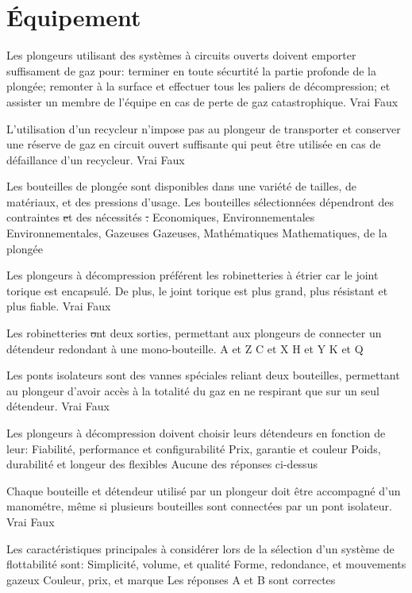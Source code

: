 \documentclass[english,10pt,a4paper,twoside]{article}
\begin{document}
	\section{Équipement}

	\begin{outline}
		\1 Les plongeurs utilisant des systèmes à circuits ouverts doivent emporter suffisament de gaz pour: terminer en toute sécurtité la partie profonde de la plongée; remonter à la surface et effectuer tous les paliers de décompression; et assister un membre de l'équipe en cas de perte de gaz catastrophique.
			\2 Vrai
			\2 Faux

		\1 L'utilisation d'un recycleur n'impose pas au plongeur de transporter et conserver une réserve de gaz en circuit ouvert suffisante qui peut être utilisée en cas de défaillance d'un recycleur.
			\2 Vrai
			\2 Faux

		\1 Les bouteilles de plongée sont disponibles dans une variété de tailles, de matériaux, et des pressions d'usage. Les bouteilles sélectionnées dépendront des contraintes \st et des nécessités \st.
			\2 Economiques, Environnementales
			\2 Environnementales, Gazeuses
			\2 Gazeuses, Mathématiques
			\2 Mathematiques, de la plongée

		\1 Les plongeurs à décompression préférent les robinetteries à étrier car le joint torique est encapsulé. De plus, le joint torique est plus grand, plus résistant et plus fiable.
			\2 Vrai
			\2 Faux

		\1 Les robinetteries \st ont deux sorties, permettant aux plongeurs de connecter un détendeur redondant à une mono-bouteille.
			\2 A et Z
			\2 C et X
			\2 H et Y
			\2 K et Q 

		\1 Les ponts isolateurs sont des vannes spéciales reliant deux bouteilles, permettant au plongeur d'avoir accès à la totalité du gaz en ne respirant que sur un seul détendeur.
			\2 Vrai
			\2 Faux

		\1 Les plongeurs à décompression doivent choisir leurs détendeurs en fonction de leur:
			\2 Fiabilité, performance et configurabilité
			\2 Prix, garantie et couleur
			\2 Poids, durabilité et longeur des flexibles
			\2 Aucune des réponses ci-dessus

		\1 Chaque bouteille et détendeur utilisé par un plongeur doit être accompagné d'un manométre, même si plusieurs bouteilles sont connectées par un pont isolateur.
			\2 Vrai
			\2 Faux

		\1 Les caractéristiques principales à considérer lors de la sélection d'un système de flottabilité sont:
			\2 Simplicité, volume, et qualité
			\2 Forme, redondance, et mouvements gazeux
			\2 Couleur, prix, et marque
			\2 Les réponses A et B sont correctes


\end{outline}
\end{document}
